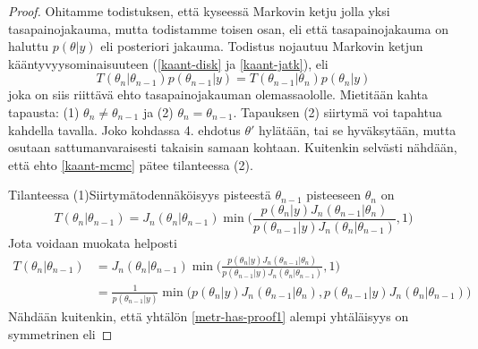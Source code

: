 \begin{proof}

	Ohitamme todistuksen, että kyseessä Markovin ketju jolla yksi tasapainojakauma, mutta todistamme toisen osan, eli että tasapainojakauma on haluttu $p(\theta|y)$ eli posteriori jakauma. Todistus nojautuu Markovin ketjun kääntyvyysominaisuuteen (\ref{kaant-disk} ja \ref{kaant-jatk}), eli
	\begin{equation}\label{kaant-mcmc}
		T(\theta_{n}|\theta_{n-1})p(\theta_{n-1}|y) = T(\theta_{n-1}|\theta_{n})p(\theta_{n}|y)
	\end{equation}
	joka on siis riittävä ehto tasapainojakauman olemassaololle. Mietitään kahta tapausta: (1) $\theta_n \neq \theta_{n-1}$ ja (2) $\theta_n = \theta_{n-1}$.
	Tapauksen (2) siirtymä voi tapahtua kahdella tavalla. Joko kohdassa 4. ehdotus $\theta'$ hylätään, tai se hyväksytään, mutta osutaan sattumanvaraisesti takaisin samaan kohtaan. Kuitenkin selvästi nähdään, että ehto \ref{kaant-mcmc} pätee tilanteessa (2).
	
	Tilanteessa (1)Siirtymätodennäköisyys pisteestä $\theta_{n-1}$ pisteeseen $\theta_n$ on
	\begin{equation}
		T(\theta_n|\theta_{n-1}) = J_n(\theta_n|\theta_{n-1})
		\min\Big( \frac{p(\theta_n|y)J_n(\theta_{n-1}|\theta_n)}{p(\theta_{n-1}|y)J_n(\theta_{n}|\theta_{n-1})},1 \Big)
	\end{equation}
	Jota voidaan muokata helposti
	\begin{equation}\label{metr-has-proof1}
		\begin{split}
			T(\theta_n|\theta_{n-1}) &= J_n(\theta_n|\theta_{n-1})
		\min\Big( \frac{p(\theta_n|y)J_n(\theta_{n-1}|\theta_n)}{p(\theta_{n-1}|y)J_n(\theta_{n}|\theta_{n-1})},1 \Big) \\
		&= \frac{1}{p(\theta_{n-1}|y)} \min \Big( p(\theta_n|y)J_n(\theta_{n-1}|\theta_n) , p(\theta_{n-1}|y)J_n(\theta_n|\theta_{n-1})  \Big)
		\end{split}
	\end{equation}
	Nähdään kuitenkin, että yhtälön \ref{metr-has-proof1} alempi yhtäläisyys on symmetrinen eli
	

\end{proof}
